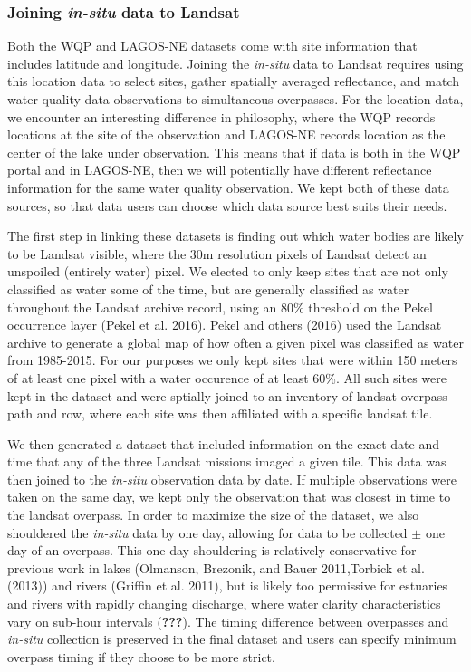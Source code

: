 \documentclass[]{article}
\begin{document}
\subsubsection{\texorpdfstring{Joining \emph{in-situ} data to
Landsat}{Joining in-situ data to Landsat}}\label{joining-in-situ-data-to-landsat}

Both the WQP and LAGOS-NE datasets come with site information that
includes latitude and longitude. Joining the \emph{in-situ} data to
Landsat requires using this location data to select sites, gather
spatially averaged reflectance, and match water quality data
observations to simultaneous overpasses. For the location data, we
encounter an interesting difference in philosophy, where the WQP records
locations at the site of the observation and LAGOS-NE records location
as the center of the lake under observation. This means that if data is
both in the WQP portal and in LAGOS-NE, then we will potentially have
different reflectance information for the same water quality
observation. We kept both of these data sources, so that data users can
choose which data source best suits their needs.

The first step in linking these datasets is finding out which water
bodies are likely to be Landsat visible, where the 30m resolution pixels
of Landsat detect an unspoiled (entirely water) pixel. We elected to
only keep sites that are not only classified as water some of the time,
but are generally classified as water throughout the Landsat archive
record, using an 80\% threshold on the Pekel occurrence layer (Pekel et
al. 2016). Pekel and others (2016) used the Landsat archive to generate
a global map of how often a given pixel was classified as water from
1985-2015. For our purposes we only kept sites that were within 150
meters of at least one pixel with a water occurence of at least 60\%.
All such sites were kept in the dataset and were sptially joined to an
inventory of landsat overpass path and row, where each site was then
affiliated with a specific landsat tile.

We then generated a dataset that included information on the exact date
and time that any of the three Landsat missions imaged a given tile.
This data was then joined to the \emph{in-situ} observation data by
date. If multiple observations were taken on the same day, we kept only
the observation that was closest in time to the landsat overpass. In
order to maximize the size of the dataset, we also shouldered the
\emph{in-situ} data by one day, allowing for data to be collected
\(\pm\) one day of an overpass. This one-day shouldering is relatively
conservative for previous work in lakes (Olmanson, Brezonik, and Bauer
2011,Torbick et al. (2013)) and rivers (Griffin et al. 2011), but is
likely too permissive for estuaries and rivers with rapidly changing
discharge, where water clarity characteristics vary on sub-hour
intervals ({\textbf{???}}). The timing difference between overpasses and
\emph{in-situ} collection is preserved in the final dataset and users
can specify minimum overpass timing if they choose to be more strict.
\end{document}
